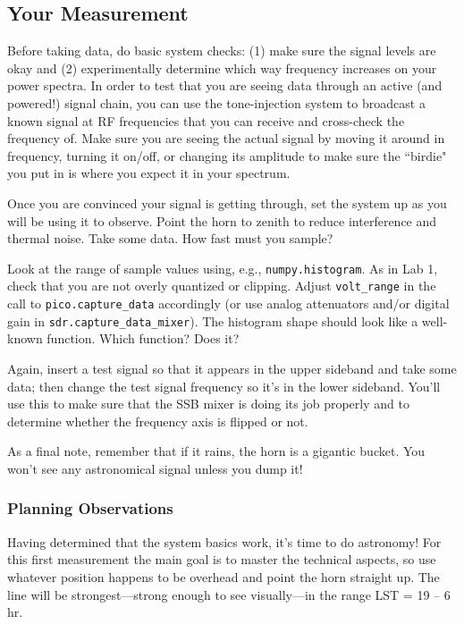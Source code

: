 \documentclass[11pt,preprint]{aastex}
\begin{document}
\subsection{Your Measurement}

\noindent
Before taking data, do basic system
checks: (1) make sure the signal levels are okay and (2) experimentally
determine which way frequency increases on your power spectra. In order
to test that you are seeing data through an active (and powered!) signal
chain, you can use the tone-injection system to broadcast a known
signal at RF frequencies that you can receive and cross-check the
frequency of. Make sure you are seeing the actual signal by moving
it around in frequency, turning it on/off, or changing its amplitude
to make sure the ``birdie" you put in is where you expect it in
your spectrum.

Once you are convinced your signal is getting through,
set the system up as you will be using it to observe. Point the
 horn to zenith to reduce interference and thermal noise.  Take some
data.  How fast must you sample? 

Look at the range of sample values using, e.g.,
  {\tt numpy.histogram}.  As in Lab 1, check that you are not overly quantized or clipping.
  Adjust {\tt volt\_range} in the call to {\tt pico.capture\_data}
  accordingly (or use analog attenuators and/or 
digital gain in {\tt sdr.capture\_data\_mixer}).
  The histogram shape should look like a well-known function. Which
  function? Does it?

Again, insert a test signal so that it appears in the upper sideband and
take some data; then change the test signal frequency so it's in the
lower sideband.  You'll use this to make sure that the SSB mixer is
doing its job properly and to determine whether the frequency axis
is flipped or not.

As a final note, remember that if it rains, the horn is a gigantic bucket. 
You won't see any astronomical signal unless you dump it!

\subsubsection{Planning Observations}

\noindent
Having determined that the system basics work, it's time to do
astronomy! For this first measurement the main goal is to master the
technical aspects, so use whatever position happens to be overhead and
point the horn straight up. The line will be strongest---strong enough
to see visually---in the range LST = 19 -- 6 hr.
\end{document}
